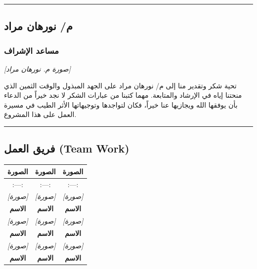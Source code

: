\documentclass[12pt, a4paper]{report}
\begin{document}
\vspace{0.5cm}\hrule\vspace{0.5cm}
\newpage

\begin{center}

\section*{م/ نورهان مراد}
\subsection*{مساعد الإشراف}

\textit{[صورة م. نورهان مراد]} \\

\end{center}

تحية شكر وتقدير منا إلى م/ نورهان مراد على الجهد المبذول والوقت الثمين الذي منحتنا إياه في الإرشاد والمتابعة. مهما كتبنا من عبارات الشكر لا نجد خيراً من الدعاء بأن يوفقها الله ويجازيها عنا خيراً، فكان لتواجدها وتوجيهاتها الأثر الطيب في مسيرة العمل على هذا المشروع. \\

\vspace{0.5cm}\hrule\vspace{0.5cm}
\newpage

\begin{center}

\chapter*{فريق العمل (Team Work)}

\end{center}

\begin{longtable}{|c|c|c|}
\hline
الصورة & الصورة & الصورة \\ \hline
:---: & :---: & :---: \\ \hline
\textit{[صورة]} & \textit{[صورة]} & \textit{[صورة]} \\ \hline
\textbf{الاسم} & \textbf{الاسم} & \textbf{الاسم} \\ \hline
\textit{[صورة]} & \textit{[صورة]} & \textit{[صورة]} \\ \hline
\textbf{الاسم} & \textbf{الاسم} & \textbf{الاسم} \\ \hline
\textit{[صورة]} & \textit{[صورة]} & \textit{[صورة]} \\ \hline
\textbf{الاسم} & \textbf{الاسم} & \textbf{الاسم} \\ \hline
\end{longtable}
\end{document}
